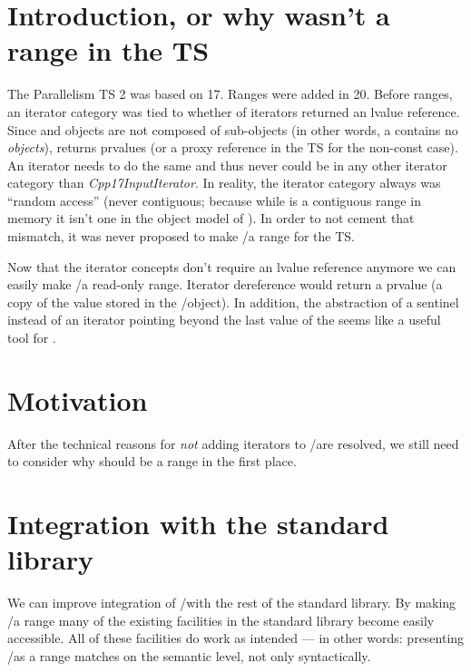 


\section{Introduction, or why  wasn't a range in the TS}

The Parallelism TS 2 was based on \CC{}17.
Ranges were added in \CC{}20.
Before ranges, an iterator category was tied to whether  of iterators returned an
lvalue reference.
Since \simd and \mask objects are not composed of sub-objects (in other words, a 
contains no  \emph{objects}),  returns prvalues (or a proxy reference
in the TS for the non-const case).
An iterator needs to do the same and thus never could be in any other iterator category than
\emph{Cpp17InputIterator}.
In reality, the iterator category always was “random access” (never contiguous; because while \simd
is a contiguous range in memory it isn't one in the object model of \CC{}).
In order to not cement that mismatch, it was never proposed to make \simd/\mask a range for the TS.

Now that the iterator concepts don't require an lvalue reference anymore we can easily make
\simd/\mask a read-only range.
Iterator dereference would return a prvalue (a copy of the value stored in the \simd/\mask object).
In addition, the abstraction of a sentinel instead of an iterator pointing beyond the last value of
the \simd seems like a useful tool for \simd.

\section{Motivation}

After the technical reasons for \emph{not} adding iterators to \simd/\mask are resolved, we still
need to consider why \simd should be a range in the first place.

\section{Integration with the standard library}

We can improve integration of \simd/\mask with the rest of the standard library.
By making \simd/\mask a range many of the existing facilities in the standard library become
easily accessible.
All of these facilities do work as intended — in other words: presenting \simd/\mask as a range
matches on the semantic level, not only syntactically.

